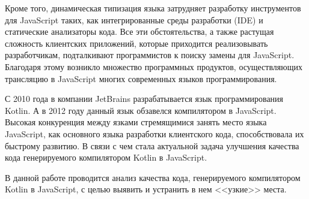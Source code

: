 Кроме того, динамическая типизация языка затрудняет разработку инструментов для JavaScript таких, как интегрированные среды разработки (IDE) и статические анализаторы кода. Все эти обстоятельства, а также растущая сложность клиентских приложений, которые приходится реализовывать разработчикам, подталкивают программистов к поиску замены для JavaScript. Благодаря этому возникло множество программных продуктов, осуществляющих трансляцию в JavaScript многих современных языков программирования.\cite{AltJS}

С 2010 года в компании JetBrains разрабатывается язык программирования Kotlin. А в 2012 году данный язык обзавелся компилятором в JavaScript. Высокая конкуренция между язками стремящимися занять место языка JavaScript, как основного языка разработки клиентского кода, способствовала их быстрому развитию. В связи с чем стала актуальной задача улучшения качества кода генерируемого компилятором Kotlin в JavaScript.

В данной работе проводится анализ качества кода, генерируемого компилятором Kotlin в JavaScript, с целью выявить и устранить в нем <<узкие>> места. %






